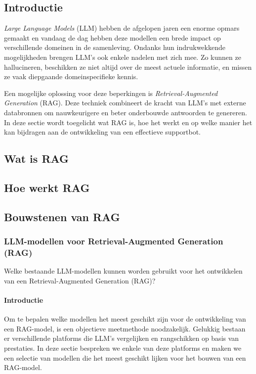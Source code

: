     \subsection{Introductie}   
    \textit{Large Language Models} (LLM) hebben de afgelopen jaren een enorme opmars gemaakt en vandaag de dag hebben deze modellen een brede impact op verschillende domeinen in de samenleving. Ondanks hun indrukwekkende mogelijkheden brengen LLM’s ook enkele nadelen met zich mee. Zo kunnen ze hallucineren, beschikken ze niet altijd over de meest actuele informatie, en missen ze vaak diepgaande domeinspecifieke kennis.  
    
    Een mogelijke oplossing voor deze beperkingen is \textit{Retrieval-Augmented Generation} (RAG). Deze techniek combineert de kracht van LLM’s met externe databronnen om nauwkeurigere en beter onderbouwde antwoorden te genereren. In deze sectie wordt toegelicht wat RAG is, hoe het werkt en op welke manier het kan bijdragen aan de ontwikkeling van een effectieve supportbot.
    
    
    \subsection{Wat is RAG}
    
    
    \subsection{Hoe werkt RAG}
    
    
    \subsection{Bouwstenen van RAG}
    
    
        \subsubsection{LLM-modellen voor Retrieval-Augmented Generation (RAG)}
        Welke bestaande LLM-modellen kunnen worden gebruikt voor het ontwikkelen van een Retrieval-Augmented Generation (RAG)? 
        
        
        \paragraph{Introductie}
        Om te bepalen welke modellen het meest geschikt zijn voor de ontwikkeling van een RAG-model, is een objectieve meetmethode noodzakelijk. Gelukkig bestaan er verschillende platforms die LLM's vergelijken en rangschikken op basis van prestaties. In deze sectie bespreken we enkele van deze platforms en maken we een selectie van modellen die het meest geschikt lijken voor het bouwen van een RAG-model.
        
